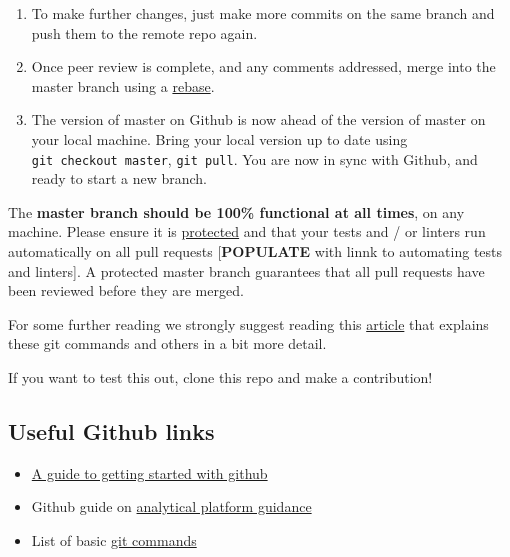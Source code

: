 \documentclass[]{book}
\providecommand{\tightlist}{%
  \setlength{\itemsep}{0pt}\setlength{\parskip}{0pt}}
\begin{document}
\begin{enumerate}
\def\labelenumi{\arabic{enumi}.}
\setcounter{enumi}{5}
\item
  To make further changes, just make more commits on the same branch and push them to the remote repo again.
\item
  Once peer review is complete, and any comments addressed, merge into the master branch using a \href{https://github.com/blog/2243-rebase-and-merge-pull-requests}{rebase}.
\item
  The version of master on Github is now ahead of the version of master on your local machine. Bring your local version up to date using \texttt{git\ checkout\ master}, \texttt{git\ pull}. You are now in sync with Github, and ready to start a new branch.
\end{enumerate}

The \textbf{master branch should be 100\% functional at all times}, on any machine. Please ensure it is \href{https://help.github.com/articles/about-protected-branches/}{protected} and that your tests and / or linters run automatically on all pull requests {[}\textbf{POPULATE} with linnk to automating tests and linters{]}. A protected master branch guarantees that all pull requests have been reviewed before they are merged.

For some further reading we strongly suggest reading this \href{https://gist.github.com/blackfalcon/8428401}{article} that explains these git commands and others in a bit more detail.

If you want to test this out, clone this repo and make a contribution!

\hypertarget{gitlink}{%
\subsection*{Useful Github links}\label{gitlink}}

\begin{itemize}
\tightlist
\item
  \href{https://jennybc.github.io/2014-05-12-ubc/ubc-r/session2.4_github.html}{A guide to getting started with github}\\
\item
  Github guide on \href{https://user-guidance.services.alpha.mojanalytics.xyz/github.html\#creating-your-project-repo-on-github}{analytical platform guidance}\\
\item
  List of basic \href{https://guides.github.com/introduction/git-handbook/}{git commands}
\end{itemize}
\end{document}
